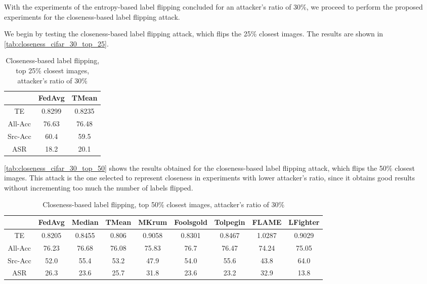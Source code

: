 With the experiments of the entropy-based label flipping concluded for an attacker's ratio of 30\%, we proceed to perform the proposed experiments for the closeness-based label flipping attack.

We begin by testing the closeness-based label flipping attack, which flips the 25\% closest images. The results are shown in \autoref{tab:closeness_cifar_30_top_25}. 

\begin{table}[h!]
        \centering
        \small
        \begin{adjustbox}{center}
        \begin{tabular}{|c|c|c|}
            \hline
            & FedAvg & TMean \\
            \hline
            TE & 0.8299 & 0.8235 \\
            \hline
            All-Acc & 76.63 & 76.48 \\
            \hline
            Src-Acc & 60.4 & 59.5 \\
            \hline
            ASR & 18.2 & 20.1 \\
            \hline
        \end{tabular}
        \end{adjustbox}
        \caption{Closeness-based label flipping, top 25\% closest images, attacker's ratio of 30\%}
        \label{tab:closeness_cifar_30_top_25}
    \end{table}


\autoref{tab:closeness_cifar_30_top_50} shows the results obtained for the closeness-based label flipping attack, which flips the 50\% closest images. This attack is the one selected to represent closeness in experiments with lower attacker's ratio, since it obtains good results without incrementing too much the number of labels flipped.

\begin{table}[h!]
        \centering
        \small
        \begin{adjustbox}{center}
        \begin{tabular}{|c|c|c|c|c|c|c|c|c|}
            \hline
            & FedAvg & Median & TMean & MKrum & Foolsgold & Tolpegin & FLAME & LFighter \\
            \hline
            TE & 0.8205 & 0.8455 & 0.806 & 0.9058 & 0.8301 & 0.8467 & 1.0287 & 0.9029 \\
            \hline
            All-Acc & 76.23 & 76.68 & 76.08 & 75.83 & 76.7 & 76.47 & 74.24 & 75.05 \\
            \hline
            Src-Acc & 52.0 & 55.4 & 53.2 & 47.9 & 54.0 & 55.6 & 43.8 & 64.0 \\
            \hline
            ASR & 26.3 & 23.6 & 25.7 & 31.8 & 23.6 & 23.2 & 32.9 & 13.8 \\
            \hline
        \end{tabular}
        \end{adjustbox}
        \caption{Closeness-based label flipping, top 50\% closest images, attacker's ratio of 30\%}
        \label{tab:closeness_cifar_30_top_50}
    \end{table}
    


